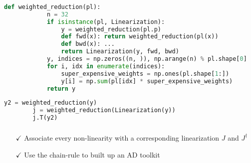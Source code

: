 \documentclass[aspectratio=169,xcolor=dvipsnames]{beamer}
\begin{document}
\begin{frame}[fragile]
	\frametitle{\insertsection}
	\framesubtitle{\insertsubsection}

	\begin{lstlisting}[language=python,escapechar=!]
		def weighted_reduction(pl):
			n = 32
			if isinstance(pl, Linearization):
				y = weighted_reduction(pl.p)
				def fwd(x): return weighted_reduction(pl(x))
				def bwd(x): ...
				return Linearization(y, fwd, bwd)
			y, indices = np.zeros((n, )), np.arange(n) % pl.shape[0]
			for i, idx in enumerate(indices):
				super_expensive_weights = np.ones(pl.shape[1:])
				y[i] = np.sum(pl[idx] * super_expensive_weights)
			return y
	\end{lstlisting}

	\begin{lstlisting}[language=python,escapechar=!]
		y2 = weighted_reduction(y)
		j = weighted_reduction(Linearization(y))
		j.T(y2)
	\end{lstlisting}

\end{frame}

\begin{frame}
	\frametitle{\insertsection}
	\framesubtitle{\insertsubsection}

	\begin{enumerate}
		\item[$\checkmark$] Associate every non-linearity with a corresponding linearization $J$ and $J^\dagger$
		\item[$\checkmark$] Use the chain-rule to built up an AD toolkit
	\end{enumerate}

\end{frame}
\end{document}
